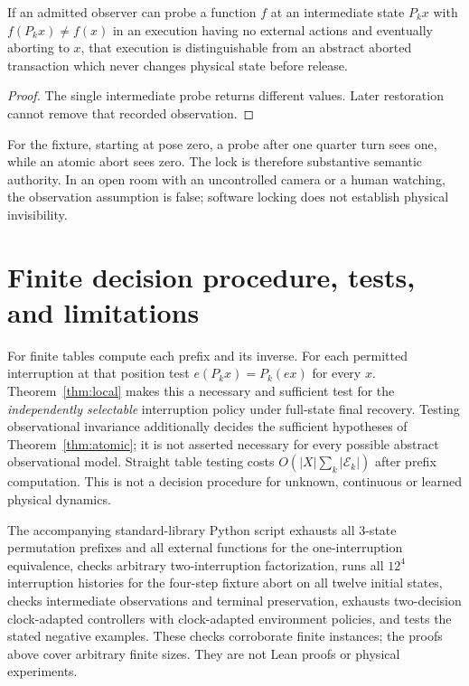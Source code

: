 \documentclass[11pt]{article}
\begin{document}
\begin{proposition}
If an admitted observer can probe a function $f$ at an intermediate state $P_kx$ with $f(P_kx)\ne f(x)$ in an execution having no external actions and eventually aborting to $x$, that execution is distinguishable from an abstract aborted transaction which never changes physical state before release.
\end{proposition}
\begin{proof}
The single intermediate probe returns different values. Later restoration cannot remove that recorded observation.
\end{proof}
For the fixture, starting at pose zero, a probe after one quarter turn sees one, while an atomic abort sees zero. The lock is therefore substantive semantic authority. In an open room with an uncontrolled camera or a human watching, the observation assumption is false; software locking does not establish physical invisibility.

\section{Finite decision procedure, tests, and limitations}
For finite tables compute each prefix and its inverse. For each permitted interruption at that position test $e(P_kx)=P_k(e x)$ for every $x$. Theorem~\ref{thm:local} makes this a necessary and sufficient test for the \emph{independently selectable} interruption policy under full-state final recovery. Testing observational invariance additionally decides the sufficient hypotheses of Theorem~\ref{thm:atomic}; it is not asserted necessary for every possible abstract observational model. Straight table testing costs $O(|X|\sum_k|\mathcal E_k|)$ after prefix computation. This is not a decision procedure for unknown, continuous or learned physical dynamics.

The accompanying standard-library Python script exhausts all $3$-state permutation prefixes and all external functions for the one-interruption equivalence, checks arbitrary two-interruption factorization, runs all $12^4$ interruption histories for the four-step fixture abort on all twelve initial states, checks intermediate observations and terminal preservation, exhausts two-decision clock-adapted controllers with clock-adapted environment policies, and tests the stated negative examples. These checks corroborate finite instances; the proofs above cover arbitrary finite sizes. They are not Lean proofs or physical experiments.
\end{document}
